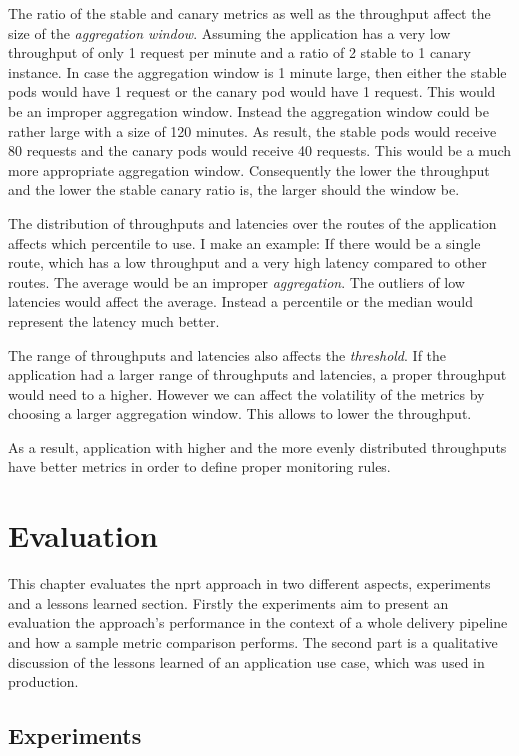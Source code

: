 The ratio of the stable and canary metrics as well as the throughput affect the size of
the \emph{aggregation window}. Assuming the application has a very low throughput of only
1 request per minute and a ratio of 2 stable to 1 canary instance. In case the aggregation
window is 1 minute large, then either the stable pods would have 1 request or the canary
pod would have 1 request. This would be an improper aggregation window. Instead the
aggregation window could be rather large with a size of 120 minutes. As result, the stable
pods would receive 80 requests and the canary pods would receive 40 requests. This would
be a much more appropriate aggregation window. Consequently the lower the throughput and
the lower the stable canary ratio is, the larger should the window be.

The distribution of throughputs and latencies over the routes of the application affects
which percentile to use. I make an example: If there would be a single route, which has a
low throughput and a very high latency compared to other routes. The average would be an
improper \emph{aggregation}. The outliers of low latencies would affect the
average. Instead a percentile or the median would represent the latency much better.

The range of throughputs and latencies also affects the \emph{threshold}. If the
application had a larger range of throughputs and latencies, a proper throughput would
need to a higher. However we can affect the volatility of the metrics by choosing a larger
aggregation window. This allows to lower the throughput.

As a result, application with higher and the more evenly distributed throughputs have
better metrics in order to define proper monitoring rules.

\chapter{Evaluation}
\label{chap:eval}

This chapter evaluates the \gls{nprt} approach in two different aspects, experiments and a
lessons learned section. Firstly the experiments aim to present an evaluation the
approach's performance in the context of a whole delivery pipeline and how a sample metric
comparison performs. The second part is a qualitative discussion of the lessons learned of
an application use case, which was used in production.

\section{Experiments}

